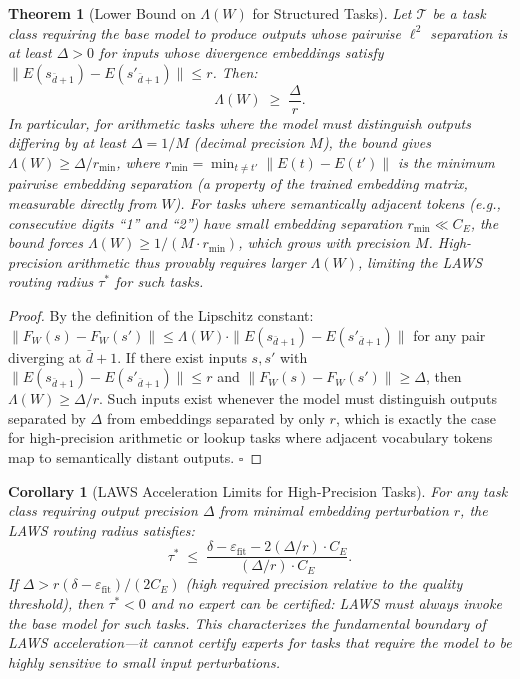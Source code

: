 \documentclass[11pt]{article}
\newtheorem{theorem}{Theorem}
\newtheorem{corollary}{Corollary}
\begin{document}
\begin{theorem}[Lower Bound on $\Lambda(W)$ for Structured Tasks]
\label{thm:lambda_lower}
Let $\mathcal{T}$ be a task class requiring the base model to produce outputs
whose pairwise $\ell^2$ separation is at least $\Delta > 0$ for inputs whose
divergence embeddings satisfy $\|E(s_{\bar{d}+1}) - E(s'_{\bar{d}+1})\| \leq r$.
Then:
\[
  \Lambda(W) \;\geq\; \frac{\Delta}{r}.
\]
In particular, for arithmetic tasks where the model must distinguish outputs
differing by at least $\Delta = 1/M$ (decimal precision $M$), the bound gives
$\Lambda(W) \geq \Delta / r_{\min}$, where $r_{\min} = \min_{t \neq t'}\|E(t) - E(t')\|$
is the minimum pairwise embedding separation (a property of the trained embedding matrix,
measurable directly from $W$).  For tasks where semantically adjacent tokens (e.g.,
consecutive digits ``1'' and ``2'') have small embedding separation $r_{\min} \ll C_E$,
the bound forces $\Lambda(W) \geq 1/(M \cdot r_{\min})$, which grows with precision $M$.
High-precision arithmetic thus provably requires larger $\Lambda(W)$, limiting
the LAWS routing radius $\tau^*$ for such tasks.
\end{theorem}

\begin{proof}
By the definition of the Lipschitz constant:
$\|F_W(s) - F_W(s')\| \leq \Lambda(W) \cdot \|E(s_{\bar{d}+1}) - E(s'_{\bar{d}+1})\|$
for any pair diverging at $\bar{d}+1$.  If there exist inputs $s, s'$ with
$\|E(s_{\bar{d}+1}) - E(s'_{\bar{d}+1})\| \leq r$ and $\|F_W(s) - F_W(s')\| \geq \Delta$,
then $\Lambda(W) \geq \Delta/r$.  Such inputs exist whenever the model must
distinguish outputs separated by $\Delta$ from embeddings separated by only $r$,
which is exactly the case for high-precision arithmetic or lookup tasks where
adjacent vocabulary tokens map to semantically distant outputs. $\square$
\end{proof}

\begin{corollary}[LAWS Acceleration Limits for High-Precision Tasks]
\label{cor:lambda_hardness}
For any task class requiring output precision $\Delta$ from minimal embedding
perturbation $r$, the LAWS routing radius satisfies:
\[
  \tau^* \;\leq\; \frac{\delta - \varepsilon_{\mathrm{fit}} - 2(\Delta/r) \cdot C_E}{(\Delta/r) \cdot C_E}.
\]
If $\Delta > r(\delta - \varepsilon_{\mathrm{fit}})/(2 C_E)$ (high required precision relative to the quality threshold),
then $\tau^* < 0$ and no expert can be certified: LAWS must always invoke the
base model for such tasks.  This characterizes the \emph{fundamental boundary}
of LAWS acceleration---it cannot certify experts for tasks that require the
model to be highly sensitive to small input perturbations.
\end{corollary}
\end{document}
